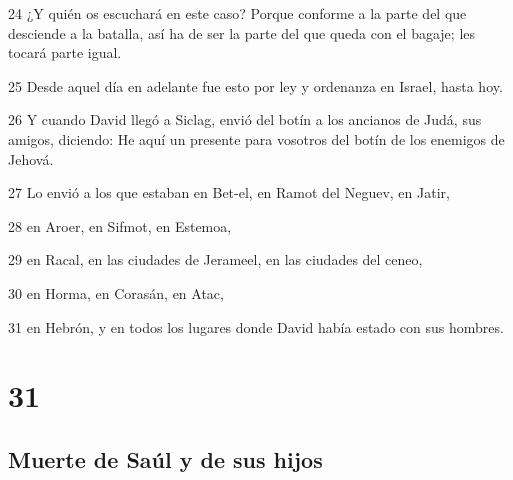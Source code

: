 {\par 24 ¿Y quién os escuchará en este caso? Porque conforme a la parte del que desciende a la batalla, así ha de ser la parte del que queda con el bagaje; les tocará parte igual.
\par 25 Desde aquel día en adelante fue esto por ley y ordenanza en Israel, hasta hoy.
\par 26 Y cuando David llegó a Siclag, envió del botín a los ancianos de Judá, sus amigos, diciendo: He aquí un presente para vosotros del botín de los enemigos de Jehová.
\par 27 Lo envió a los que estaban en Bet-el, en Ramot del Neguev, en Jatir,
\par 28 en Aroer, en Sifmot, en Estemoa,
\par 29 en Racal, en las ciudades de Jerameel, en las ciudades del ceneo,
\par 30 en Horma, en Corasán, en Atac,
\par 31 en Hebrón, y en todos los lugares donde David había estado con sus hombres.

\chapter{31}

\section*{Muerte de Saúl y de sus hijos }

}
